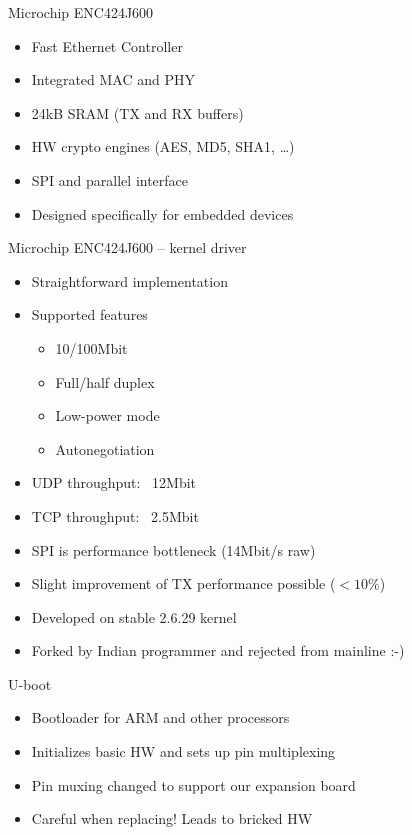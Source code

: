 \documentclass{beamer}
\begin{document}
\begin{frame}{Microchip ENC424J600}
\begin{itemize}
	\item Fast Ethernet Controller
	\item Integrated MAC and PHY
	\item 24kB SRAM (TX and RX buffers)
	\item HW crypto engines (AES, MD5, SHA1, \ldots)
	\item SPI and parallel interface
	\item Designed specifically for embedded devices
\end{itemize}

\end{frame}

\begin{frame}{Microchip ENC424J600 -- kernel driver}
\begin{itemize}
	\item Straightforward implementation
	\item Supported features
	\begin{itemize}
		\item 10/100Mbit
		\item Full/half duplex
		\item Low-power mode
		\item Autonegotiation
	\end{itemize}
	\item UDP throughput: ~12Mbit
	\item TCP throughput: ~2.5Mbit
	\item SPI is performance bottleneck (14Mbit/s raw)
	\item Slight improvement of TX performance possible (\( < 10\%\))
	\item Developed on stable 2.6.29 kernel
	\item Forked by Indian programmer and rejected from mainline :-)
\end{itemize}
\end{frame}

\begin{frame}{U-boot}
\begin{itemize}
	\item Bootloader for ARM and other processors
	\item Initializes basic HW and sets up pin multiplexing
	\item Pin muxing changed to support our expansion board
	\item Careful when replacing! Leads to bricked HW
\end{itemize}
\end{frame}
\end{document}
